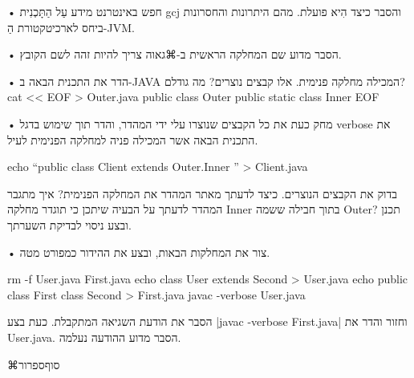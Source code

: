 • חפש באינטרנט מידע עַל הַתָּכְנִית gcj והסבר כיצד הִיא פועלת. מהם היתרונות
  והחסרונות ביחס לארכיטקטורת הַ-JVM.

• הסבר מדוע שם המחלקה הראשית ב-⌘גאוה צריך להיות זהה לשם הקובץ.

• הדר את התכנית הבאה ב-JAVA המכילה מחלקה פנימית. אלו קבצים נוצרים? מה גודלם?
cat << EOF > Outer.java
public class Outer {
  public static class Inner {
  }
}
EOF
\END

• מחק כעת את כל הקבצים שנוצרו עלי ידי המהדר, והדר תוך שימוש בדגל verbose את
התכנית הבאה אשר המכילה פניה למחלקה הפנימית לעיל.

echo “public class Client extends Outer.Inner { }” > Client.java
\END

 בדוק את הקבצים הנוצרים. כיצד לדעתך מאתר המהדר את המחלקה הפנימית? איך מתגבר
המהדר לדעתך על הבעיה שיתכן כי תוגדר מחלקה Inner בתוך חבילה ששמה Outer? תכנן
ובצע ניסוי לבדיקת השערתך.

• צור את המחלקות הבאות, ובצע את ההידור כמפורט מטה.

rm -f User.java First.java
echo class User extends Second {} > User.java
echo public class First {} class Second{} > First.java
javac -verbose User.java
\END

הסבר את הודעת השגיאה המתקבלת. כעת בצע
\E|javac -verbose First.java|
 וחזור והדר את User.java.
הסבר מדוע ההודעה נעלמה.

⌘סוף{ספרור}
